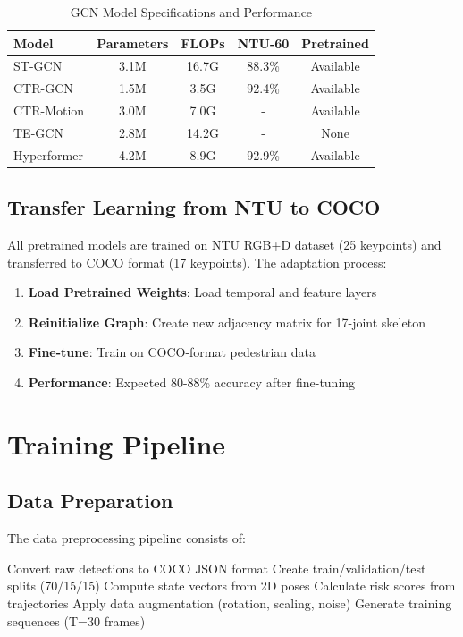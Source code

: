 \documentclass[11pt,a4paper]{article}
\begin{document}
\begin{table}[h]
\centering
\caption{GCN Model Specifications and Performance}
\begin{tabular}{lcccc}
\toprule
\textbf{Model} & \textbf{Parameters} & \textbf{FLOPs} & \textbf{NTU-60} & \textbf{Pretrained} \\
\midrule
ST-GCN & 3.1M & 16.7G & 88.3\% & Available \\
CTR-GCN & 1.5M & 3.5G & 92.4\% & Available \\
CTR-Motion & 3.0M & 7.0G & - & Available \\
TE-GCN & 2.8M & 14.2G & - & None \\
Hyperformer & 4.2M & 8.9G & 92.9\% & Available \\
\bottomrule
\end{tabular}
\end{table}

\subsection{Transfer Learning from NTU to COCO}

All pretrained models are trained on NTU RGB+D dataset (25 keypoints) and transferred to COCO format (17 keypoints). The adaptation process:

\begin{enumerate}
    \item \textbf{Load Pretrained Weights}: Load temporal and feature layers
    \item \textbf{Reinitialize Graph}: Create new adjacency matrix for 17-joint skeleton
    \item \textbf{Fine-tune}: Train on COCO-format pedestrian data
    \item \textbf{Performance}: Expected 80-88\% accuracy after fine-tuning
\end{enumerate}

\section{Training Pipeline}

\subsection{Data Preparation}

The data preprocessing pipeline consists of:

\begin{algorithm}
\caption{Data Preprocessing Pipeline}
\begin{algorithmic}[1]
\State Convert raw detections to COCO JSON format
\State Create train/validation/test splits (70/15/15)
\State Compute state vectors from 2D poses
\State Calculate risk scores from trajectories
\State Apply data augmentation (rotation, scaling, noise)
\State Generate training sequences (T=30 frames)
\end{algorithmic}
\end{algorithm}
\end{document}
